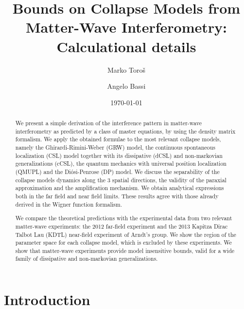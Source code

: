 \documentclass[12pt,groupedaddress,pra,aps]{revtex4-1}
\begin{document}
\author{Marko Toro\v{s}}
\author{Angelo Bassi}



\title{Bounds on Collapse Models from Matter-Wave Interferometry: Calculational details}

\date{\today}

\begin{abstract}
We present a simple derivation of the interference pattern in matter-wave interferometry as predicted by a class of master equations, by using the density matrix formalism. We apply the obtained formulae to the most relevant collapse models, namely the Ghirardi-Rimini-Weber (GRW) model, the continuous spontaneous localization (CSL) model together with its dissipative (dCSL) and non-markovian generalizations (cCSL), the quantum mechanics with universal position localization (QMUPL) and the Di\'{o}si-Penrose (DP) model. We discuss the separability of the collapse models dynamics along the 3 spatial directions, the validity of the paraxial approximation and the amplification mechanism.
We obtain analytical expressions both in the far field and near field limits. These results agree with those already derived in the Wigner function formalism. 

We compare the theoretical predictions with the experimental data from two relevant matter-wave experiments: the 2012 far-field experiment and the 2013 Kapitza Dirac Talbot Lau (KDTL) near-field experiment of Arndt's group. We show the region of the parameter space for each collapse model, which is excluded by these experiments. We show that matter-wave experiments provide model insensitive bounds, valid for a wide family of dissipative and non-markovian generalizations. 
\end{abstract}

\maketitle 

\section{Introduction}\label{introduction}
\end{document}
